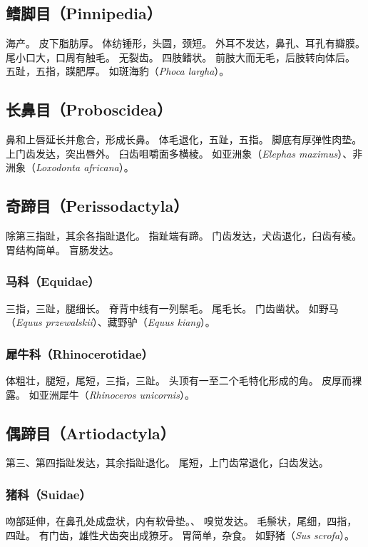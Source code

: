 \documentclass[11pt]{article}
\begin{document}
\subsection{鳍脚目（Pinnipedia）}
海产。
皮下脂肪厚。
体纺锤形，头圆，颈短。
外耳不发达，鼻孔、耳孔有瓣膜。
尾小口大，口周有触毛。
无裂齿。
四肢鳍状。
前肢大而无毛，后肢转向体后。
五趾，五指，蹼肥厚。
如斑海豹（\textit{Phoca largha}）。

\subsection{长鼻目（Proboscidea）}
鼻和上唇延长并愈合，形成长鼻。
体毛退化，五趾，五指。
脚底有厚弹性肉垫。
上门齿发达，突出唇外。
臼齿咀嚼面多横棱。
如亚洲象（\textit{Elephas maximus}）、非洲象（\textit{Loxodonta africana}）。

\subsection{奇蹄目（Perissodactyla）}
除第三指趾，其余各指趾退化。
指趾端有蹄。
门齿发达，犬齿退化，臼齿有棱。
胃结构简单。
盲肠发达。

\subsubsection{马科（Equidae）}
三指，三趾，腿细长。
脊背中线有一列鬃毛。
尾毛长。
门齿凿状。
如野马（\textit{Equus przewalskii}）、藏野驴（\textit{Equus kiang}）。

\subsubsection{犀牛科（Rhinocerotidae）}
体粗壮，腿短，尾短，三指，三趾。
头顶有一至二个毛特化形成的角。
皮厚而裸露。
如亚洲犀牛（\textit{Rhinoceros unicornis}）。

\subsection{偶蹄目（Artiodactyla）}
第三、第四指趾发达，其余指趾退化。
尾短，上门齿常退化，臼齿发达。

\subsubsection{猪科（Suidae）}
吻部延伸，在鼻孔处成盘状，内有软骨垫。、
嗅觉发达。
毛鬃状，尾细，四指，四趾。
有门齿，雄性犬齿突出成獠牙。
胃简单，杂食。
如野猪（\textit{Sus scrofa}）。
\end{document}
